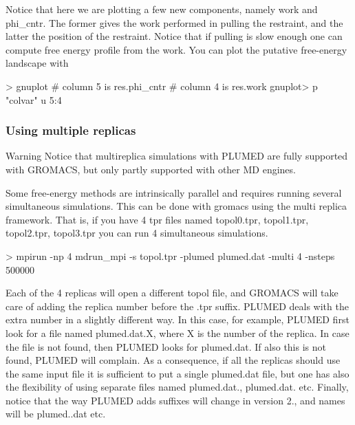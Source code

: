 Notice that here we are plotting a few new components, namely {\ttfamily work} and {\ttfamily phi\+\_\+cntr}. The former gives the work performed in pulling the restraint, and the latter the position of the restraint. Notice that if pulling is slow enough one can compute free energy profile from the work. You can plot the putative free-\/energy landscape with \begin{DoxyVerb}> gnuplot
# column 5 is res.phi_cntr
# column 4 is res.work
gnuplot> p "colvar" u 5:4
\end{DoxyVerb}


\hypertarget{munster_munster-multi}{}\subsubsection{Using multiple replicas}\label{munster_munster-multi}
\begin{DoxyWarning}{Warning}
Notice that multireplica simulations with P\+L\+U\+M\+E\+D are fully supported with G\+R\+O\+M\+A\+C\+S, but only partly supported with other M\+D engines.
\end{DoxyWarning}
Some free-\/energy methods are intrinsically parallel and requires running several simultaneous simulations. This can be done with gromacs using the multi replica framework. That is, if you have 4 tpr files named topol0.\+tpr, topol1.\+tpr, topol2.\+tpr, topol3.\+tpr you can run 4 simultaneous simulations. \begin{DoxyVerb}> mpirun -np 4 mdrun_mpi -s topol.tpr -plumed plumed.dat -multi 4 -nsteps 500000
\end{DoxyVerb}
 Each of the 4 replicas will open a different topol file, and G\+R\+O\+M\+A\+C\+S will take care of adding the replica number before the .tpr suffix. P\+L\+U\+M\+E\+D deals with the extra number in a slightly different way. In this case, for example, P\+L\+U\+M\+E\+D first look for a file named {\ttfamily plumed.\+dat.\+X}, where X is the number of the replica. In case the file is not found, then P\+L\+U\+M\+E\+D looks for {\ttfamily plumed.\+dat}. If also this is not found, P\+L\+U\+M\+E\+D will complain. As a consequence, if all the replicas should use the same input file it is sufficient to put a single {\ttfamily plumed.\+dat} file, but one has also the flexibility of using separate files named {\ttfamily plumed.\+dat.}, {\ttfamily plumed.\+dat.} etc. Finally, notice that the way P\+L\+U\+M\+E\+D adds suffixes will change in version 2., and names will be {\ttfamily plumed..\+dat} etc.

